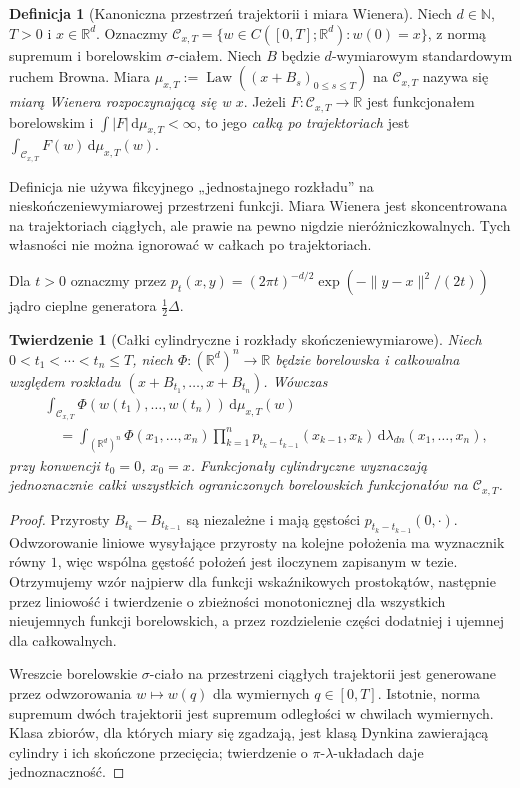 \documentclass[11pt,a4paper,oneside]{report}
\numberwithin{equation}{chapter}
\theoremstyle{plain}
\newtheorem{twierdzenie}{Twierdzenie}[chapter]
\theoremstyle{definition}
\newtheorem{definicja}{Definicja}[chapter]
\theoremstyle{remark}
\newcommand{\R}{\mathbb{R}}
\newcommand{\N}{\mathbb{N}}
\newcommand{\Law}{\operatorname{Law}}
\newcommand{\calC}{\mathcal{C}}
\newcommand{\dd}{\mathrm{d}}
\begin{document}
\begin{definicja}[Kanoniczna przestrzeń trajektorii i miara Wienera]
\label{def:path-wiener}
Niech $d\in\N$, $T>0$ i $x\in\R^d$. Oznaczmy
$\calC_{x,T}=\{w\in C([0,T];\R^d):w(0)=x\}$, z normą
supremum i borelowskim $\sigma$-ciałem. Niech $B$ będzie
$d$-wymiarowym standardowym ruchem Browna. Miara
$\mu_{x,T}:=\Law((x+B_s)_{0\le s\le T})$ na $\calC_{x,T}$
nazywa się \emph{miarą Wienera rozpoczynającą się w $x$}.
Jeżeli $F:\calC_{x,T}\to\R$ jest funkcjonałem borelowskim
i $\int|F|\,\dd\mu_{x,T}<\infty$, to jego \emph{całką
po trajektoriach} jest $\int_{\calC_{x,T}}F(w)\,\dd\mu_{x,T}(w)$.
\end{definicja}

Definicja nie używa fikcyjnego „jednostajnego rozkładu” na
nieskończeniewymiarowej przestrzeni funkcji. Miara Wienera jest
skoncentrowana na trajektoriach ciągłych, ale prawie na pewno
nigdzie nieróżniczkowalnych. Tych własności nie można ignorować
w całkach po trajektoriach.

Dla $t>0$ oznaczmy przez
$p_t(x,y)=(2\pi t)^{-d/2}\exp(-\|y-x\|^2/(2t))$
jądro cieplne generatora $\frac12\Delta$.

\begin{twierdzenie}[Całki cylindryczne i rozkłady skończeniewymiarowe]
\label{th:path-cylinder}
Niech $0<t_1<\cdots<t_n\le T$, niech
$\Phi:(\R^d)^n\to\R$ będzie borelowska i całkowalna
względem rozkładu $(x+B_{t_1},\ldots,x+B_{t_n})$.
Wówczas
\[
\begin{split}
 &\int_{\calC_{x,T}}\Phi(w(t_1),\ldots,w(t_n))\,
       \dd\mu_{x,T}(w)\\
 &\quad=\int_{(\R^d)^n}\Phi(x_1,\ldots,x_n)
   \prod_{k=1}^n p_{t_k-t_{k-1}}(x_{k-1},x_k)
   \,\dd\lambda_{dn}(x_1,\ldots,x_n),
\end{split}
\]
przy konwencji $t_0=0$, $x_0=x$. Funkcjonały cylindryczne
wyznaczają jednoznacznie całki wszystkich ograniczonych
borelowskich funkcjonałów na $\calC_{x,T}$.
\end{twierdzenie}
\begin{proof}
Przyrosty $B_{t_k}-B_{t_{k-1}}$ są niezależne i mają gęstości
$p_{t_k-t_{k-1}}(0,\cdot)$. Odwzorowanie liniowe wysyłające
przyrosty na kolejne położenia ma wyznacznik równy $1$,
więc wspólna gęstość położeń jest iloczynem zapisanym w tezie.
Otrzymujemy wzór najpierw dla funkcji wskaźnikowych
prostokątów, następnie przez liniowość i twierdzenie o
zbieżności monotonicznej dla wszystkich nieujemnych
funkcji borelowskich, a przez rozdzielenie części dodatniej
i ujemnej dla całkowalnych.

Wreszcie borelowskie $\sigma$-ciało na przestrzeni
ciągłych trajektorii jest generowane przez odwzorowania
$w\mapsto w(q)$ dla wymiernych $q\in[0,T]$.
Istotnie, norma supremum dwóch trajektorii jest supremum
odległości w chwilach wymiernych. Klasa zbiorów, dla
których miary się zgadzają, jest klasą Dynkina zawierającą
cylindry i ich skończone przecięcia; twierdzenie o
$\pi$-$\lambda$-układach daje jednoznaczność.
\end{proof}
\end{document}
